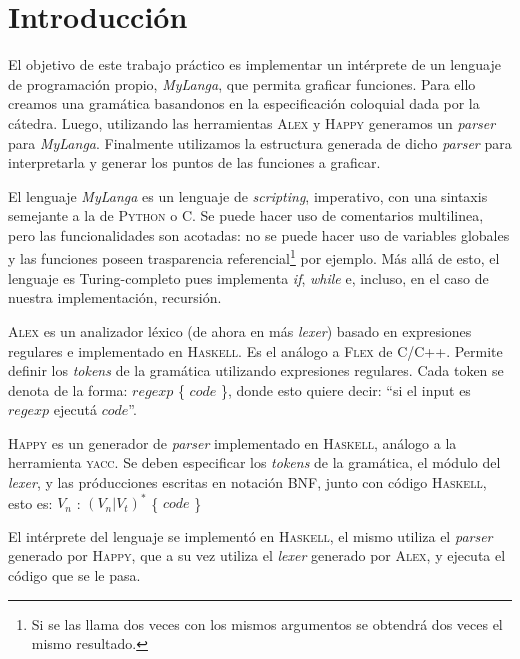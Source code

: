 \section{Introducci\'on}

    El objetivo de este trabajo pr\'actico es implementar un int\'erprete
de un lenguaje de programaci\'on propio, \textit{MyLanga}, que permita graficar funciones.
Para ello creamos 
una gram\'atica basandonos en la especificaci\'on coloquial dada por la 
c\'atedra. 
Luego, utilizando las herramientas \textsc{Alex} y \textsc{Happy} generamos
un \textit{parser} para \textit{MyLanga}. Finalmente utilizamos la estructura generada de
dicho \textit{parser} para interpretarla y generar los puntos de las funciones a graficar.

    El lenguaje \textit{MyLanga} es un lenguaje de \textit{scripting}, imperativo,
con una sintaxis semejante a la de \textsc{Python} o \textsc{C}. Se puede hacer
uso de comentarios multilinea, pero las funcionalidades son acotadas:
no se puede hacer uso de variables globales y las funciones poseen trasparencia
referencial\footnote{Si se las llama dos veces con los mismos argumentos se obtendr\'a
dos veces el mismo resultado.} por ejemplo.
M\'as all\'a de esto, el lenguaje es Turing-completo pues implementa \textit{if},
\textit{while} e, incluso, en el caso de nuestra implementaci\'on, recursi\'on.

    \textsc{Alex} es un analizador l\'exico (de ahora en m\'as \textit{lexer})
basado en expresiones regulares e implementado
en \textsc{Haskell}. Es el an\'alogo a \textsc{Flex} de \textsc{C/C++}.
Permite definir los \textit{tokens}
de la gram\'atica utilizando expresiones regulares. Cada token se denota de
la forma: $regexp$ \{ $code$ \}, donde esto quiere decir: ``si el input es $regexp$
ejecut\'a $code$''.

    \textsc{Happy} es un generador de \textit{parser} implementado en \textsc{Haskell},
an\'alogo a la 
herramienta \textsc{yacc}. Se deben especificar los \textit{tokens} de la gram\'atica,
el m\'odulo del \textit{lexer}, y las pr\'oducciones escritas en notaci\'on
\textsc{BNF}, junto con c\'odigo \textsc{Haskell}, esto es: 
$V_n$ : $(V_n|V_t)^{*}$ \{ $code$ \} 

    El int\'erprete del lenguaje se implement\'o en \textsc{Haskell}, el mismo utiliza el
\textit{parser} generado por \textsc{Happy}, que a su vez utiliza el \textit{lexer} generado
por \textsc{Alex}, y ejecuta el c\'odigo que se le pasa. 


